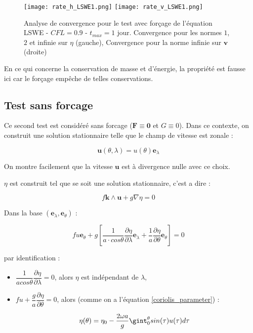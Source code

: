 \begin{figure}[ht!]
\begin{center}
\texttt{[image: rate\_h\_LSWE1.png]}
\texttt{[image: rate\_v\_LSWE1.png]}
\caption{Analyse de convergence pour le test avec forçage de l'équation LSWE - $CFL=0.9$ - $t_{max}=1$ jour. Convergence pour les normes $1$, $2$ et infinie sur $\eta$ (gauche), Convergence pour la norme infinie sur $\mathbf{v}$ (droite)}
\label{fig:accuracy lswe 1}
\end{center}
\end{figure}

En ce qui concerne la conservation de masse et d'énergie, la propriété est fausse ici car le forçage empêche de telles conservations.

\subsection{Test sans forcage}


Ce second test est considéré sans forcage ($\mathbf{F} \equiv \mathbf{0}$ et $G \equiv 0$). Dans ce contexte, on construit une solution stationnaire telle que le champ de vitesse est zonale :

$$\mathbf{u}(\theta, \lambda) = u(\theta) \mathbf{e}_{\lambda}$$

On montre facilement que la vitesse $ \mathbf{u}$ est à divergence nulle avec ce choix.

$\eta$ est construit tel que se soit une solution stationnaire, c'est a dire :

\begin{equation}
f \mathbf{k} \wedge \mathbf{u} + g \nabla \eta = 0
\end{equation} 

Dans la base $(\mathbf{e}_{\lambda}, \mathbf{e}_{\theta})$ :

\begin{equation}
f u \mathbf{e}_{\theta} + g \left[ \dfrac{1}{a \cdot cos \theta} \dfrac{\partial \eta}{\partial \lambda} \mathbf{e}_{\lambda} + \dfrac{1}{a}\dfrac{\partial \eta}{\partial \theta} \mathbf{e}_{\theta} \right] = 0
\end{equation}

par identification :

\begin{itemize}
\item $\dfrac{1}{a cos \theta} \dfrac{\partial \eta}{\partial \lambda} = 0$, alors $\eta$ est indépendant de $\lambda$,

\item $f u + \dfrac{g}{a} \dfrac{\partial \eta}{\partial \theta} = 0$, alors (comme on a l'équation \eqref{coriolis_parameter}) :

\begin{equation}
\eta (\theta ) = \eta_0 - \dfrac{2 \omega a}{g} \gint_0^{\theta} sin(\tau) u(\tau) d \tau
\end{equation} 
\end{itemize}

